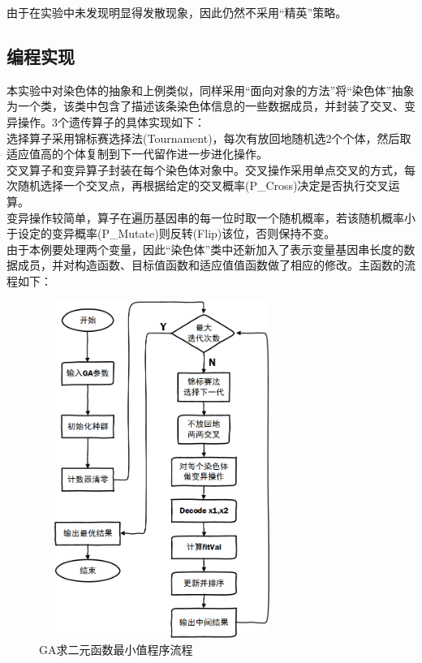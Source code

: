 \documentclass[UTF8]{ctexart}
\begin{document}
\indent 由于在实验中未发现明显得发散现象，因此仍然不采用“精英”策略。

\subsection{编程实现}
本实验中对染色体的抽象和上例类似，同样采用“面向对象的方法”将“染色体”抽象为一个类，该类中包含了描述该条染色体信息的一些数据成员，并封装了交叉、变异操作。3个遗传算子的具体实现如下：\\
\indent 选择算子采用锦标赛选择法(Tournament)，每次有放回地随机选2个个体，然后取适应值高的个体复制到下一代留作进一步进化操作。\\
\indent 交叉算子和变异算子封装在每个染色体对象中。交叉操作采用单点交叉的方式，每次随机选择一个交叉点，再根据给定的交叉概率(P\_Cross)决定是否执行交叉运算。\\
\indent 变异操作较简单，算子在遍历基因串的每一位时取一个随机概率，若该随机概率小于设定的变异概率(P\_Mutate)则反转(Flip)该位，否则保持不变。\\
\indent 由于本例要处理两个变量，因此“染色体”类中还新加入了表示变量基因串长度的数据成员，并对构造函数、目标值函数和适应值值函数做了相应的修改。主函数的流程如下：
\begin{figure}[htbp]\centering
\includegraphics [width=8cm,height=11cm]{../pic/T1-2_procedure.png} 
\caption{GA求二元函数最小值程序流程}
\end{figure}
\end{document}
